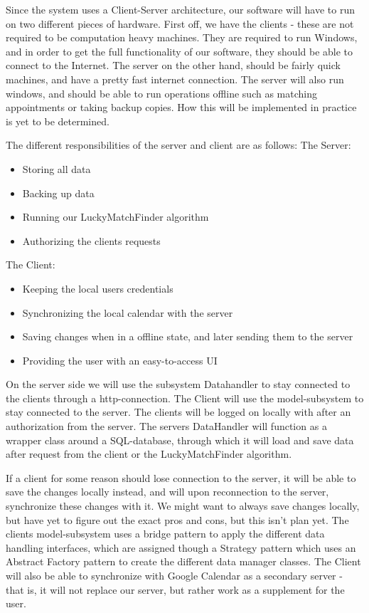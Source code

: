 Since the system uses a Client-Server architecture, our software will have to run on two different pieces of hardware. First off, we have the clients - these are not required to be computation heavy machines. They are required to run Windows, and in order to get the full functionality of our software, they should be able to connect to the Internet. 
The server on the other hand, should be fairly quick machines, and have a pretty fast internet connection. The server will also run windows, and should be able to run operations offline such as matching appointments or taking backup copies. How this will be implemented in practice is yet to be determined. 

The different responsibilities of the server and client are as follows:
The Server:
\begin{itemize}
	\item Storing all data
	\item Backing up data
	\item Running our LuckyMatchFinder algorithm
	\item Authorizing the clients requests
\end{itemize}
The Client:
\begin{itemize}
	\item Keeping the local users credentials
	\item Synchronizing the local calendar with the server
	\item Saving changes when in a offline state, and later sending them to the server
	\item Providing the user with an easy-to-access UI
\end{itemize}

On the server side we will use the subsystem Datahandler to stay connected to the clients through a http-connection. The Client will use the model-subsystem to stay connected to the server. The clients will be logged on locally with after an authorization from the server.
The servers DataHandler will function as a wrapper class around a SQL-database, through which it will load and save data after request from the client or the LuckyMatchFinder algorithm. 

If a client for some reason should lose connection to the server, it will be able to save the changes locally instead, and will upon reconnection to the server, synchronize these changes with it. We might want to always save changes locally, but have yet to figure out the exact pros and cons, but this isn't plan yet. The clients model-subsystem uses a bridge pattern to apply the different data handling interfaces, which are assigned though a Strategy pattern which uses an Abstract Factory pattern to create the different data manager classes. The Client will also be able to synchronize with Google Calendar as a secondary server - that is, it will not replace our server, but rather work as a supplement for the user. 
